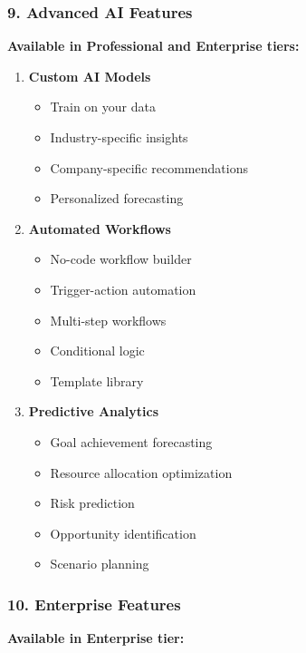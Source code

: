 \subsubsection{9. Advanced AI Features}

\textbf{Available in Professional and Enterprise tiers:}

\begin{enumerate}
    \item \textbf{Custom AI Models}
    \begin{itemize}
        \item Train on your data
        \item Industry-specific insights
        \item Company-specific recommendations
        \item Personalized forecasting
    \end{itemize}
    
    \item \textbf{Automated Workflows}
    \begin{itemize}
        \item No-code workflow builder
        \item Trigger-action automation
        \item Multi-step workflows
        \item Conditional logic
        \item Template library
    \end{itemize}
    
    \item \textbf{Predictive Analytics}
    \begin{itemize}
        \item Goal achievement forecasting
        \item Resource allocation optimization
        \item Risk prediction
        \item Opportunity identification
        \item Scenario planning
    \end{itemize}
\end{enumerate}

\subsubsection{10. Enterprise Features}

\textbf{Available in Enterprise tier:}

